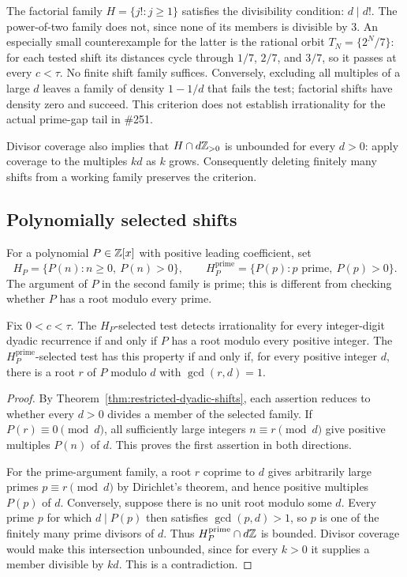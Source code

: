 \documentclass[11pt]{article}
\begin{document}
The factorial family $H=\{j!:j\ge1\}$ satisfies the divisibility condition:
$d\mid d!$. The power-of-two family does not, since none of its members is
divisible by $3$. An especially small counterexample for the latter is the
rational orbit $T_N=\{2^N/7\}$: for each tested shift its distances cycle
through $1/7$, $2/7$, and $3/7$, so it passes at every $c<\tau$.
No finite shift family suffices. Conversely, excluding all multiples of a
large $d$ leaves a family of density $1-1/d$ that fails the test; factorial
shifts have density zero and succeed. This criterion does not establish
irrationality for the actual prime-gap tail in \#251.

Divisor coverage also implies that $H\cap d\mathbb{Z}_{>0}$ is unbounded for every
$d>0$: apply coverage to the multiples $kd$ as $k$ grows. Consequently
deleting finitely many shifts from a working family preserves the criterion.

\subsection{Polynomially selected shifts}\label{sec:polynomial-shifts}

For a polynomial $P\in\mathbb{Z}[x]$ with positive leading coefficient, set
\[
 H_P=\{P(n):n\ge0,\ P(n)>0\},\qquad
 H_P^{\mathrm{prime}}=\{P(p):p\text{ prime},\ P(p)>0\}.
\]
The argument of $P$ in the second family is prime; this is different from
checking whether $P$ has a root modulo every prime.

\begin{corollary}\label{cor:polynomial-shifts}
Fix $0<c<\tau$. The $H_P$-selected test detects irrationality for every
integer-digit dyadic recurrence if and only if $P$ has a root modulo every
positive integer. The $H_P^{\mathrm{prime}}$-selected test has this property
if and only if, for every positive integer $d$, there is a root $r$ of $P$
modulo $d$ with $\gcd(r,d)=1$.
\end{corollary}

\begin{proof}
By Theorem~\ref{thm:restricted-dyadic-shifts}, each assertion reduces to
whether every $d>0$ divides a member of the selected family. If
$P(r)\equiv0\pmod d$, all sufficiently large integers $n\equiv r\pmod d$
give positive multiples $P(n)$ of $d$. This proves the first assertion in
both directions.

For the prime-argument family, a root $r$ coprime to $d$ gives arbitrarily
large primes $p\equiv r\pmod d$ by Dirichlet's theorem, and hence positive
multiples $P(p)$ of $d$. Conversely, suppose there is no unit root modulo
some $d$. Every prime $p$ for which $d\mid P(p)$ then satisfies
$\gcd(p,d)>1$, so $p$ is one of the finitely many prime divisors of $d$.
Thus $H_P^{\mathrm{prime}}\cap d\mathbb{Z}$ is bounded. Divisor coverage would make
this intersection unbounded, since for every $k>0$ it supplies a member
divisible by $kd$. This is a contradiction.
\end{proof}
\end{document}

